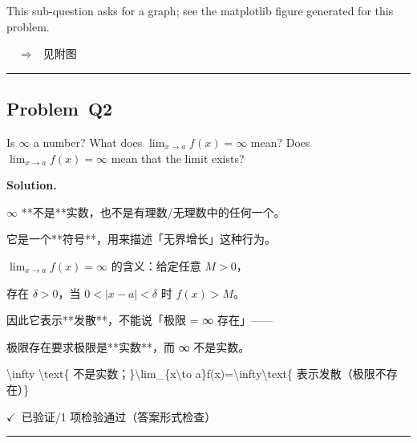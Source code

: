 \documentclass[12pt, a4paper]{article}
\newcommand{\problem}[1]{\subsection*{Problem~#1}}
\newcommand{\solution}{%
  \par\noindent
  {\color{solutiongreen}\bfseries Solution.}\par
}
\newcommand{\verifyok}{\textcolor{solutiongreen}{\ensuremath{\checkmark}\ 已验证}}
\begin{document}
This sub-question asks for a graph; see the matplotlib figure generated for this problem.

$\quad\Rightarrow\quad \text{见附图}$


\vspace{0.8em}\hrule\vspace{0.8em}

\problem{Q2}

\begin{stepbox}
Is $\infty$ a number? What does $\lim_{x \to a} f(x) = \infty$ mean? Does $\lim_{x \to a} f(x) = \infty$ mean that the limit exists?
\end{stepbox}

\solution

\begin{stepbox}
$\infty$ **不是**实数，也不是有理数/无理数中的任何一个。
\end{stepbox}

\begin{stepbox}
它是一个**符号**，用来描述「无界增长」这种行为。
\end{stepbox}

\begin{stepbox}
$\lim_{x\to a}f(x)=\infty$ 的含义：给定任意 $M>0$，
\end{stepbox}

\begin{stepbox}
存在 $\delta>0$，当 $0<|x-a|<\delta$ 时 $f(x)>M$。
\end{stepbox}

\begin{stepbox}
因此它表示**发散**，不能说「极限 = ∞ 存在」——
\end{stepbox}

\begin{stepbox}
极限存在要求极限是**实数**，而 ∞ 不是实数。
\end{stepbox}

\begin{center}
\textbackslash{}infty \textbackslash{}text\{ 不是实数；\}\textbackslash{}lim\_\{x\textbackslash{}to a\}f(x)=\textbackslash{}infty\textbackslash{}text\{ 表示发散（极限不存在）\}
\end{center}

\begin{verifybox}\small \verifyok{}/1 项检验通过（答案形式检查） \end{verifybox}

\vspace{0.8em}\hrule\vspace{0.8em}
\end{document}
